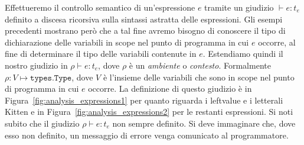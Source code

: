 Effettueremo il controllo semantico di un'espressione $e$ tramite un giudizio
$\vdash e:t_e$ definito a discesa ricorsiva sulla sintassi astratta delle
espressioni. Gli esempi precedenti mostrano per\`o che a tal fine avremo
bisogno di conoscere il tipo di dichiarazione
delle variabili in scope nel punto di programma in cui $e$ occorre,
al fine di determinare il tipo delle variabili contenute in $e$.
Estendiamo quindi il nostro giudizio in $\rho\vdash e:t_e$,
dove $\rho$ \`e un \emph{ambiente} o \emph{contesto}.
Formalmente $\rho:V\mapsto\mathtt{types.Type}$, dove
$V$ \`e l'insieme delle variabili che sono in scope nel punto di programma
in cui $e$ occorre. La definizione di questo giudizio \`e in
Figura~\ref{fig:analysis_expressions1} per quanto riguarda i leftvalue e i
letterali Kitten e in Figura~\ref{fig:analysis_expressions2} per le restanti
espressioni.
Si noti subito che il giudizio $\rho\vdash e:t_e$ non \e sempre definito.
Si deve immaginare che, dove esso non \e definito, un messaggio di errore
venga comunicato al programmatore.

